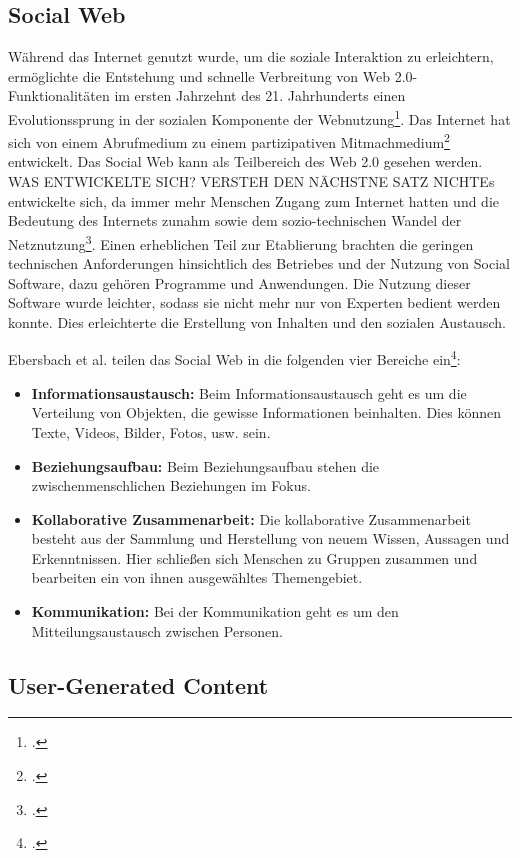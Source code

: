 \subsection{Social Web}

Während das Internet genutzt wurde, um die soziale Interaktion zu erleichtern, ermöglichte die Entstehung und schnelle Verbreitung von Web 2.0-Funktionalitäten im ersten Jahrzehnt des 21. Jahrhunderts einen Evolutionssprung in der sozialen Komponente der Webnutzung\footcite[S. 745-750]{obarSocialMedia}. Das Internet hat sich von einem Abrufmedium zu einem partizipativen Mitmachmedium\footcite{panke} entwickelt. Das Social Web kann als Teilbereich des Web 2.0 gesehen werden. WAS ENTWICKELTE SICH? VERSTEH DEN NÄCHSTNE SATZ NICHTEs entwickelte sich, da immer mehr Menschen Zugang zum Internet hatten und die Bedeutung des Internets zunahm sowie dem sozio-technischen Wandel der Netznutzung\footcite[S. 350]{griesbaum}. Einen erheblichen Teil zur Etablierung brachten die geringen technischen Anforderungen hinsichtlich des Betriebes und der Nutzung von Social Software, dazu gehören Programme und Anwendungen. Die Nutzung dieser Software wurde leichter, sodass sie nicht mehr nur von Experten bedient werden konnte. Dies erleichterte die Erstellung von Inhalten und den sozialen Austausch.

Ebersbach et al. teilen das Social Web in die folgenden vier Bereiche ein\footcite[S. 35-36]{ebersbach}:

\begin{itemize}
	\item \textbf{Informationsaustausch:} Beim Informationsaustausch geht es um die Verteilung von Objekten, die gewisse Informationen beinhalten.  Dies können Texte, Videos, Bilder, Fotos, usw. sein.
	\item \textbf{Beziehungsaufbau:} Beim Beziehungsaufbau stehen die zwischenmenschlichen Beziehungen im Fokus. 
	\item \textbf{Kollaborative Zusammenarbeit:} Die kollaborative Zusammenarbeit besteht aus der Sammlung und Herstellung von neuem Wissen, Aussagen und Erkenntnissen. Hier schließen sich Menschen zu Gruppen zusammen und bearbeiten ein von ihnen ausgewähltes Themengebiet.
	\item \textbf{Kommunikation:} Bei der Kommunikation geht es um den Mitteilungsaustausch zwischen Personen.
\end{itemize}


\subsection{User-Generated Content}

